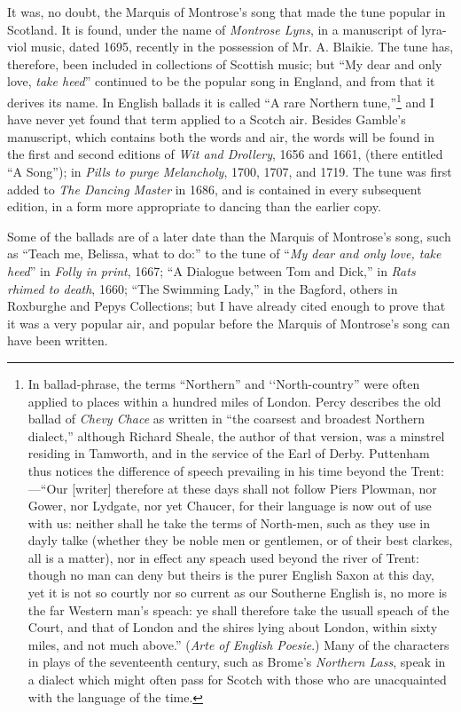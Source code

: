 It was, no doubt, the Marquis of Montrose’s song that made the tune popular
in Scotland. It is found, under the name of \textit{Montrose Lyns}, in a manuscript of
lyra-viol music, dated 1695, recently in the possession of Mr. A. Blaikie. The
tune has, therefore, been included in collections of Scottish music; but “My dear
and only love, \textit{take heed}” continued to be the popular song in England, and from
that it derives its name. In English ballads it is called “A rare Northern
tune,”\footnote{\textit{}
In ballad-phrase, the terms “Northern” and ‘‘North-country”
were often applied to places within a hundred
miles of London. Percy describes the old ballad of \textit{Chevy
Chace} as written in “the coarsest and broadest Northern
dialect,” although Richard Sheale, the author of that version,
was a minstrel residing in Tamworth, and in the
service of the Earl of Derby. Puttenham thus notices
the difference of speech prevailing in his time beyond the
Trent:—“Our [writer] therefore at these days shall not
follow Piers Plowman, nor Gower, nor Lydgate, nor yet
Chaucer, for their language is now out of use with us:
neither shall he take the terms of North-men, such as they
use in dayly talke (whether they be noble men or gentlemen,
or of their best clarkes, all is a matter), nor in effect
any speach used beyond the river of Trent: though no man
can deny but theirs is the purer English Saxon at this day,
yet it is not so courtly nor so current as our Southerne
English is, no more is the far Western man’s speach:
ye shall therefore take the usuall speach of the Court,
and that of London and the shires lying about London,
within sixty miles, and not much above.” (\textit{Arte of
English Poesie}.) Many of the characters in plays of the
seventeenth century, such as Brome’s \textit{Northern Lass},
speak in a dialect which might often pass for Scotch with
those who are unacquainted with the language of the
time.}
 and I have never yet found that term applied to a Scotch air. Besides
Gamble’s manuscript, which contains both the words and air, the words will be
found in the first and second editions of \textit{Wit and Drollery}, 1656 and 1661,
(there entitled “A Song”); in \textit{ Pills to purge Melancholy}, 1700, 1707, and 1719.
The tune was first added to \textit{The Dancing Master} in 1686, and is contained in
every subsequent edition, in a form more appropriate to dancing than the
earlier copy.

Some of the ballads are of a later date than the Marquis of Montrose’s
song, such as “Teach me, Belissa, what to do:” to the tune of “\textit{My dear and
only love, take heed}” in \textit{Folly in print}, 1667; “A Dialogue between Tom and
Dick,” in \textit{Rats rhimed to death}, 1660; “The Swimming Lady,” in the Bagford,
others in Roxburghe and Pepys Collections; but I have already cited enough to
prove that it was a very popular air, and popular before the Marquis of Montrose’s
song can have been written.

